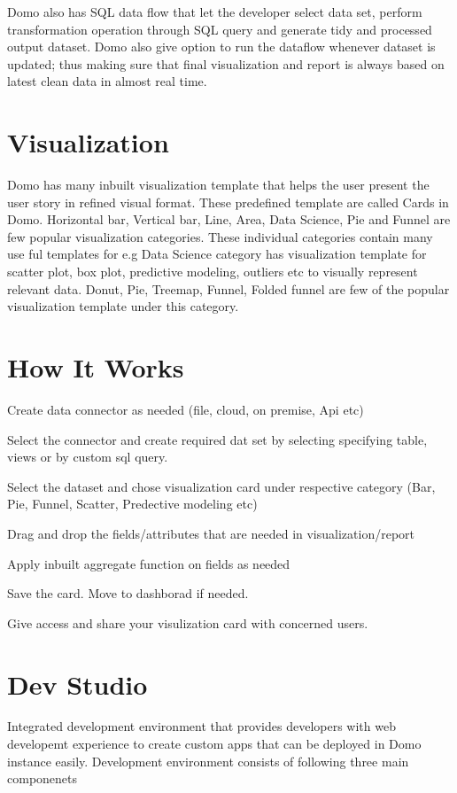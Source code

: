 Domo also has SQL data flow that let the developer select 
data set, perform transformation operation through SQL query 
and generate tidy and processed output dataset. Domo also 
give option to run the dataflow whenever dataset is updated; 
thus making sure that final visualization and report is 
always based on latest clean data in almost real time.


\section{Visualization}

Domo has many inbuilt visualization template that helps the 
user present the user story in refined visual format.
These predefined template are called Cards in Domo. Horizontal bar,
 Vertical bar, Line, Area, Data Science, Pie and Funnel are 
few popular visualization categories. These individual categories 
contain many use ful templates for e.g Data Science category 
has visualization template for scatter plot, box plot, predictive 
modeling, outliers etc to visually represent relevant data. 
Donut, Pie, Treemap, Funnel, Folded funnel are few of the
popular visualization template under this category.



\section{How It Works}
Create data connector as needed (file, cloud, on premise, Api etc)

Select the connector and create required dat set by 
selecting specifying table, views or by custom sql query.

Select the dataset and chose visualization card under 
respective category (Bar, Pie, Funnel, Scatter,
 Predective modeling etc)

Drag and drop the fields/attributes that are needed 
in visualization/report 

Apply inbuilt aggregate function on fields as needed 

Save the card. Move to dashborad if needed.

Give access and share your visulization card with concerned users.


\section{Dev Studio}

Integrated development environment that provides developers 
with web developemt experience to create custom apps that 
can be deployed in Domo instance easily. Development environment 
consists of following three main componenets

